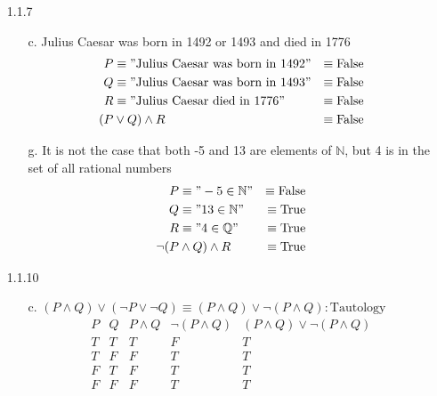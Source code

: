 \documentclass[11pt]{amsart}
\theoremstyle{definition}
\begin{document}
\begin{itemize}
\begin{itemize}
\end{itemize}

\item[1.1.7]
\begin{itemize}

    \item[c.]
    Julius Caesar was born in 1492 or 1493 and died in 1776
    \begin{align*}
        P &\equiv "\text{Julius Caesar was born in 1492}" &\equiv \text{False} \\
        Q &\equiv "\text{Julius Caesar was born in 1493}" &\equiv \text{False} \\
        R &\equiv "\text{Julius Caesar died in 1776}" &\equiv \text{False} \\
        (P &\lor Q) \land R  &\equiv \text{False}
    \end{align*}

    \item[g.]
    It is not the case that both -5 and 13 are elements of $\mathbb{N}$, but 4 is in the set of all rational numbers
    \begin{align*}
        P &\equiv "-5\in\mathbb{N}" &\equiv \text{False} \\
        Q &\equiv "13\in\mathbb{N}" &\equiv \text{True} \\
        R &\equiv "4\in\mathbb{Q}" &\equiv \text{True} \\
        \neg(P &\land Q) \land R  &\equiv \text{True}
    \end{align*}
    
\end{itemize}

\item[1.1.10]
\begin{itemize}

    \item[c.]
    $(P \land Q) \lor (\neg P \lor \neg Q) \equiv (P \land Q) \lor \neg (P \land Q) : \text{Tautology}$
    \begin{equation*}
    \begin{array}{ccccc}
        P & Q & P \land Q & \neg(P \land Q) & (P \land Q) \lor \neg (P \land Q) \\
        T & T & T & F & T \\
        T & F & F & T & T \\
        F & T & F & T & T \\
        F & F & F & T & T 
    \end{array}
    \end{equation*}
    

\end{itemize}
\end{itemize}
\end{document}
